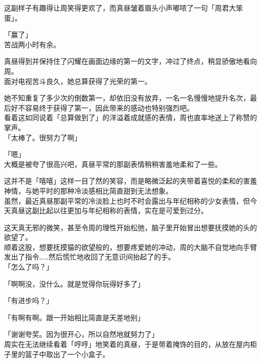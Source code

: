 这副样子有趣得让周笑得更欢了，而真昼皱着眉头小声嘟哝了一句「周君大笨蛋」。\\

\vspace{2\baselineskip}

「赢了」\\

苦战两小时有余。

真昼得到并保持住了闪耀在画面边缘的第一的文字，冲过了终点，稍显骄傲地看向周。\\

面对电视苦斗良久，她总算获得了光荣的第一。

她不知重复了多少次的倒数第一，却依旧没有放弃，一名一名慢慢地提升名次，最后好不容易终于获得了第一，因此带来的感动也特别强烈吧。\\

看着这如同说着「总算做到了」的洋溢着成就感的表情，周也直率地送上了称赞的掌声。\\

「太棒了。很努力了啊」

「嗯」\\

大概是被夸了很高兴吧，真昼平常的那副表情稍稍害羞地柔和了一些。

这并不是「嘻嘻」这样一目了然的笑容，而是略微泛起的夹带着喜悦的柔和的害羞神情，与她平时的那种冷淡感相比简直甜到无法想象。\\

虽然，最近真昼那副平常的冷淡脸上也时不时会露出与年纪相称的少女表情，但今天真昼这副比起以往更加与年纪相称的表情，实在是可爱到过分。

这天真无邪的微笑，甚至令周的理性开始松弛，脑子里开始冒出想要抚摸她的头的欲望了。\\

顺着这股，想要抚摸猫的欲望般的，想要疼爱她的冲动，周的大脑不自觉地向手臂发出了指令……然后慌忙地收回了无意识间抬起了的手。\\

「怎么了吗？」

「啊啊没，没什么。就是觉得你玩得好多了」

「有进步吗？」

「有啊有啊。跟一开始相比简直是天差地别」

「谢谢夸奖。因为很开心，所以自然地就努力了」\\

周实在无法继续看着「哼哼」地笑着的真昼，于是带着掩饰的目的，从放在屋内柜子里的篮子中取出了一个小盒子。\\

